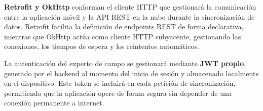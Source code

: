 \textbf{Retrofit y OkHttp} conforman el cliente HTTP que gestionará
la comunicación entre la aplicación móvil y la API REST en la nube
durante la sincronización de datos. Retrofit facilita la definición
de endpoints REST de forma declarativa, mientras que OkHttp actúa
como cliente HTTP subyacente, gestionando las conexiones, los tiempos
de espera y los reintentos automáticos.

La autenticación del experto de campo se gestionará mediante
\textbf{JWT propio}, generado por el backend al momento del inicio
de sesión y almacenado localmente en el dispositivo. Este token se
incluirá en cada petición de sincronización, permitiendo que la
aplicación opere de forma segura sin depender de una conexión
permanente a internet.